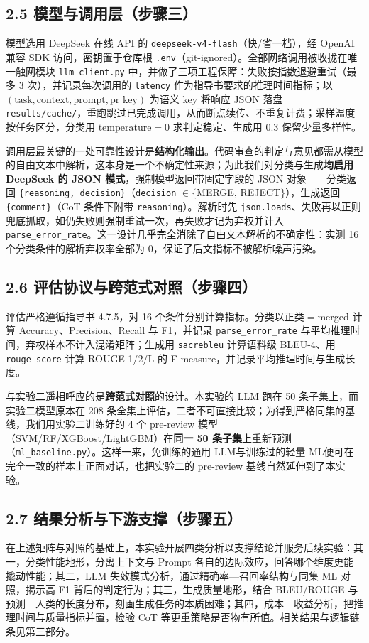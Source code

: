 \documentclass{experimentreport}
\begin{document}
{\subsection*{2.5 模型与调用层（步骤三）}

模型选用 DeepSeek 在线 API 的 \texttt{deepseek-v4-flash}（快/省一档），经 OpenAI 兼容 SDK 访问，密钥置于仓库根 \texttt{.env}（git-ignored）。全部网络调用被收拢在唯一触网模块 \texttt{llm\_client.py} 中，并做了三项工程保障：失败按指数退避重试（最多 3 次），并记录每次调用的 \texttt{latency} 作为指导书要求的推理时间指标；以 $(\text{task}, \text{context}, \text{prompt}, \text{pr\_key})$ 为语义 key 将响应 JSON 落盘 \texttt{results/cache/}，重跑跳过已完成调用，从而断点续传、不重复计费；采样温度按任务区分，分类用 $\text{temperature}=0$ 求判定稳定、生成用 $0.3$ 保留少量多样性。

调用层最关键的一处可靠性设计是\textbf{结构化输出}。代码审查的判定与意见都需从模型的自由文本中解析，这本身是一个不确定性来源；为此我们对分类与生成\textbf{均启用 DeepSeek 的 JSON 模式}，强制模型返回带固定字段的 JSON 对象——分类返回 \texttt{\{reasoning, decision\}}（\texttt{decision} $\in\{$MERGE, REJECT$\}$），生成返回 \texttt{\{comment\}}（CoT 条件下附带 \texttt{reasoning}）。解析时先 \texttt{json.loads}、失败再以正则兜底抓取，如仍失败则强制重试一次，再失败才记为弃权并计入 \texttt{parse\_error\_rate}。这一设计几乎完全消除了自由文本解析的不确定性：实测 16 个分类条件的解析弃权率全部为 0，保证了后文指标不被解析噪声污染。

\subsection*{2.6 评估协议与跨范式对照（步骤四）}

评估严格遵循指导书 4.7.5，对 16 个条件分别计算指标。分类以正类$=$merged 计算 Accuracy、Precision、Recall 与 F1，并记录 \texttt{parse\_error\_rate} 与平均推理时间，弃权样本不计入混淆矩阵；生成用 \texttt{sacrebleu} 计算语料级 BLEU-4、用 \texttt{rouge-score} 计算 ROUGE-1/2/L 的 F-measure，并记录平均推理时间与生成长度。

与实验二遥相呼应的是\textbf{跨范式对照}的设计。本实验的 LLM 跑在 50 条子集上，而实验二模型原本在 208 条全集上评估，二者不可直接比较；为得到严格同集的基线，我们用实验二训练好的 4 个 pre-review 模型（SVM/RF/XGBoost/LightGBM）在\textbf{同一 50 条子集}上重新预测（\texttt{ml\_baseline.py}）。这样一来，免训练的通用 LLM与训练过的轻量 ML便可在完全一致的样本上正面对话，也把实验二的 pre-review 基线自然延伸到了本实验。

\subsection*{2.7 结果分析与下游支撑（步骤五）}

在上述矩阵与对照的基础上，本实验开展四类分析以支撑结论并服务后续实验：其一，分类性能地形，分离上下文与 Prompt 各自的边际效应，回答哪个维度更能撬动性能；其二，LLM 失效模式分析，通过精确率—召回率结构与同集 ML 对照，揭示高 F1 背后的判定行为；其三，生成质量地形，结合 BLEU/ROUGE 与预测—人类的长度分布，刻画生成任务的本质困难；其四，成本—收益分析，把推理时间与质量指标并置，检验 CoT 等更重策略是否物有所值。相关结果与逻辑链条见第三部分。

}
\end{document}
